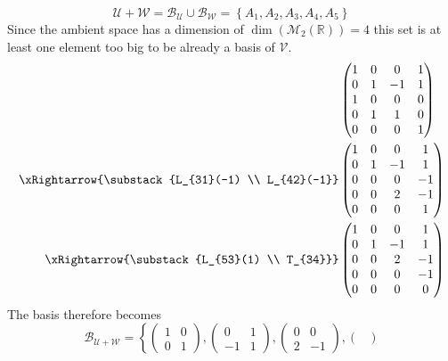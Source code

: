 \begin{exm}
	\begin{equation*}
		\mathcal{U}+\mathcal{W}=\mathcal{B}_\mathcal{U}\cup\mathcal{B}_\mathcal{W}
		=\left\{A_1,A_2,A_3,A_4,A_5\right\}
	\end{equation*}
	Since the ambient space has a dimension of $\dim(\mathcal{M}_2(\mathbb{R}))=4$
	this set is at least one element too big to be already a basis of $\mathcal{V}$.
	\begin{align*}
		 & \begin{pmatrix}
			1 & 0 & 0  & 1 \\
			0 & 1 & -1 & 1 \\
			1 & 0 & 0  & 0 \\
			0 & 1 & 1  & 0 \\
			0 & 0 & 0  & 1
		\end{pmatrix}     \\
		\xRightarrow{\substack{L_{31}(-1) \\ L_{42}(-1}}
		 & \begin{pmatrix}
			1 & 0 & 0  & 1  \\
			0 & 1 & -1 & 1  \\
			0 & 0 & 0  & -1 \\
			0 & 0 & 2  & -1 \\
			0 & 0 & 0  & 1
		\end{pmatrix}     \\
		\xRightarrow{\substack{L_{53}(1)  \\ T_{34}}}
		 & \begin{pmatrix}
			1 & 0 & 0  & 1  \\
			0 & 1 & -1 & 1  \\
			0 & 0 & 2  & -1 \\
			0 & 0 & 0  & -1 \\
			0 & 0 & 0  & 0
		\end{pmatrix}
	\end{align*}
	The basis therefore becomes
	\begin{equation*}
		\mathcal{B}_{\mathcal{U}+\mathcal{W}}=\left\{
		\begin{pmatrix}
			1 & 0 \\
			0 & 1
		\end{pmatrix},
		\begin{pmatrix}
			0  & 1 \\
			-1 & 1
		\end{pmatrix},
		\begin{pmatrix}
			0 & 0  \\
			2 & -1
		\end{pmatrix},
		\begin{pmatrix}

\end{pmatrix}
\end{equation*}
\end{exm}
